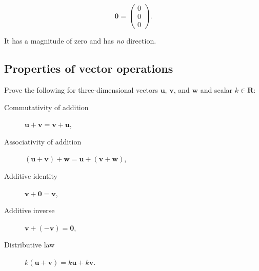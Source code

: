 \documentclass[a4paper,12pt]{amsart}
\begin{document}
    \[ \mathbf{0} = \begin{pmatrix} 0 \\ 0 \\ 0 \end{pmatrix}. \]

    It has a magnitude of zero and has \emph{no} direction.

    \subsection{Properties of vector operations}

    Prove the following for three-dimensional vectors $\mathbf{u}$, $\mathbf{v}$, and $\mathbf{w}$ and scalar $k \in \mathbf{R}$:

    \begin{description}
        \item[Commutativity of addition] $\mathbf{u} + \mathbf{v} = \mathbf{v} + \mathbf{u}$,
        \item[Associativity of addition] $(\mathbf{u} + \mathbf{v}) + \mathbf{w} = \mathbf{u} + (\mathbf{v} + \mathbf{w})$,
        \item[Additive identity] $\mathbf{v} + \mathbf{0} = \mathbf{v}$,
        \item[Additive inverse] $\mathbf{v} + (-\mathbf{v}) = \mathbf{0}$,
        \item[Distributive law] $k (\mathbf{u} + \mathbf{v}) = k \mathbf{u} + k \mathbf{v}$.
    \end{description}
\end{document}
